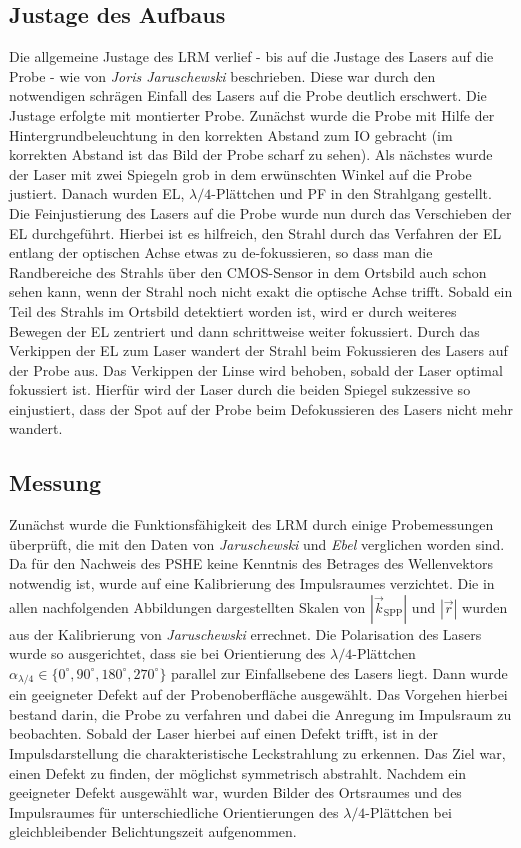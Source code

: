 \documentclass[titlepage,  ngerman]{article}
\begin{document}
	\subsection{Justage des Aufbaus}
	Die allgemeine Justage des LRM verlief - bis auf die Justage des Lasers auf die Probe - wie von \textit{Joris Jaruschewski} \cite{Jaruschewski.2020} beschrieben. Diese war durch den notwendigen schrägen Einfall des Lasers auf die Probe deutlich erschwert. Die Justage erfolgte mit montierter Probe. Zunächst wurde die Probe mit Hilfe der Hintergrundbeleuchtung in den korrekten Abstand zum IO gebracht (im korrekten Abstand ist das Bild der Probe scharf zu sehen). Als nächstes wurde der Laser mit zwei Spiegeln grob in dem erwünschten Winkel auf die Probe justiert. Danach wurden EL, $\lambda/4$-Plättchen und PF in den Strahlgang gestellt. Die Feinjustierung des Lasers auf die Probe wurde nun durch das Verschieben der EL durchgeführt. Hierbei ist es hilfreich, den Strahl durch das Verfahren der EL entlang der optischen Achse etwas zu de-fokussieren, so dass man die Randbereiche des Strahls über den CMOS-Sensor in dem Ortsbild auch schon sehen kann, wenn der Strahl noch nicht exakt die optische Achse trifft. Sobald ein Teil des Strahls im Ortsbild detektiert worden ist, wird er durch weiteres Bewegen der EL zentriert und dann schrittweise weiter fokussiert. Durch das Verkippen der EL zum Laser wandert der Strahl beim Fokussieren des Lasers auf der Probe aus. Das Verkippen der Linse wird behoben, sobald der Laser optimal fokussiert ist. Hierfür wird der Laser durch die beiden Spiegel sukzessive so einjustiert, dass der Spot auf der Probe beim Defokussieren des Lasers nicht mehr wandert.
	
		
	\subsection{Messung}
	Zunächst wurde die Funktionsfähigkeit des LRM durch einige Probemessungen überprüft, die mit den Daten von \textit{Jaruschewski} \cite{Jaruschewski.2020} und \textit{Ebel} \cite{ebel.2019} verglichen worden sind. Da für den Nachweis des PSHE keine Kenntnis des Betrages des Wellenvektors notwendig ist, wurde auf eine Kalibrierung des Impulsraumes verzichtet. Die in allen nachfolgenden Abbildungen dargestellten Skalen von $|\vec{k}_{\mathrm{SPP}}|$ und $|\vec{r}|$ wurden aus der Kalibrierung von \textit{Jaruschewski} errechnet. Die Polarisation des Lasers wurde so ausgerichtet, dass sie bei Orientierung des $\lambda/4$-Plättchen $\alpha_{\lambda/4} \in \{0^\circ, 90^\circ, 180^\circ, 270^\circ\}$ parallel zur Einfallsebene des Lasers liegt.  Dann wurde ein geeigneter Defekt auf der Probenoberfläche ausgewählt. Das Vorgehen hierbei bestand darin, die Probe zu verfahren und dabei die Anregung im Impulsraum zu beobachten. Sobald der Laser hierbei auf einen Defekt trifft, ist in der Impulsdarstellung die charakteristische Leckstrahlung zu erkennen. Das Ziel war, einen Defekt zu finden, der möglichst symmetrisch abstrahlt. Nachdem ein geeigneter Defekt ausgewählt war, wurden Bilder des Ortsraumes und des Impulsraumes für unterschiedliche Orientierungen des $\lambda/4$-Plättchen bei gleichbleibender Belichtungszeit aufgenommen.
\end{document}
